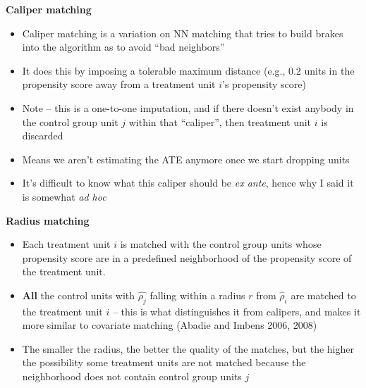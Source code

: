 \documentclass[notes=show]{beamer}
\begin{document}
\begin{frame}[plain]

	\begin{center}
	\textbf{Caliper matching}
	\end{center}
	
	\begin{itemize}
	\item Caliper matching is a variation on NN matching that tries to build brakes into the algorithm as to avoid ``bad neighbors''
	\item It does this by imposing a tolerable maximum distance (e.g., 0.2 units in the propensity score away from a treatment unit $i$'s propensity score)
	\item Note -- this is a one-to-one imputation, and if there doesn't exist anybody in the control group unit $j$ within that ``caliper'', then treatment unit $i$ is discarded
	\item Means we aren't estimating the ATE anymore once we start dropping units
	\item It's difficult to know what this caliper should be \emph{ex ante}, hence why I said it is somewhat \emph{ad hoc}
	\end{itemize}

\end{frame}


\begin{frame}[plain]

	\begin{center}
	\textbf{Radius matching}
	\end{center}
	
	
		\begin{itemize}
		\item Each treatment unit $i$ is matched with the control group units whose propensity score are in a predefined neighborhood of the propensity score of the treatment unit.
		\item \textbf{All} the control units with $\widehat{\rho_j}$ falling within a radius $r$ from $\widehat{\rho}_i$ are matched to the treatment unit $i$ -- this is what distinguishes it from calipers, and makes it more similar to covariate matching (Abadie and Imbens 2006, 2008)
		\item The smaller the radius, the better the quality of the matches, but the higher the possibility some treatment units are not matched because the neighborhood does not contain control group units $j$
		\end{itemize}
		
\end{frame}
\end{document}
